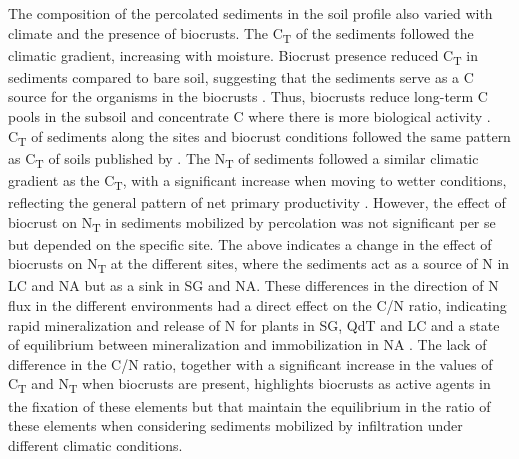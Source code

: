 The composition of the percolated sediments in the soil profile also varied with climate and the presence of biocrusts. The C\textsubscript{T} of the sediments followed the climatic gradient, increasing with moisture. Biocrust presence reduced C\textsubscript{T} in sediments compared to bare soil, suggesting that the sediments serve as a C source for the organisms in the biocrusts \citep{Sancho2016}. Thus, biocrusts reduce long-term C pools in the subsoil and concentrate C where there is more biological activity \citep{Baumert2021}. C\textsubscript{T} of sediments along the sites and biocrust conditions followed the same pattern as C\textsubscript{T} of soils published by \citet{RiverasMunoz2022}. The N\textsubscript{T} of sediments followed a similar climatic gradient as the C\textsubscript{T}, with a significant increase when moving to wetter conditions, reflecting the general pattern of net primary productivity \citep{LeBauer2008}. However, the effect of biocrust on N\textsubscript{T} in sediments mobilized by percolation was not significant per se but depended on the specific site. The above indicates a change in the effect of biocrusts on N\textsubscript{T} at the different sites, where the sediments act as a source of N in LC and NA but as a sink in SG and NA. These differences in the direction of N flux in the different environments had a direct effect on the C/N ratio, indicating rapid mineralization and release of N for plants in SG, QdT and LC and a state of equilibrium between mineralization and immobilization in NA \cite{Brust2019}. The lack of difference in the C/N ratio, together with a significant increase in the values of C\textsubscript{T} and N\textsubscript{T} when biocrusts are present, highlights biocrusts as active agents in the fixation of these elements but that maintain the equilibrium in the ratio of these elements when considering sediments mobilized by infiltration under different climatic conditions.

